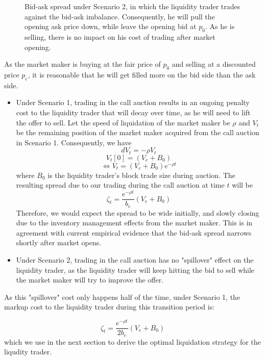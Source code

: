 \documentclass{article}
\begin{document}
\begin{itemize}
{\begin{figure}[h]
          \caption{Bid-ask spread under Scenario 2, in which the liquidity trader trades against the bid-ask imbalance. Consequently, he will pull the opening ask price down, while leave the opening bid at $p_0$. As he is selling, there is no impact on his cost of trading after market opening.}
          \label{fig:mm_pricing_transition_s2}
        \end{figure}
        }
\end{itemize}
As the market maker is buying at the fair price of $p_0$ and selling at a discounted price $p_e$, it is reasonable that he will get filled more on the bid side than the ask side.

\begin{itemize}
  \item Under Scenario 1, trading in the call auction results in an ongoing penalty cost to the liquidity trader that will decay over time, as he will need to lift the offer to sell. Let the speed of liquidation of the market maker be $\rho$ and $V_t$ be the remaining position of the market maker acquired from the call auction in Scenario 1. Consequently, we have
        \[
          dV_t = -\rho V_t
        \]
        \[
          V_t[0]=(V_e + B_0)
        \]
        \begin{equation}\label{eqn:recovery_term_eqb}
          \Leftrightarrow V_t = (V_e + B_0) e^{-\rho t}
        \end{equation}
        where $B_0$ is the liquidity trader's block trade size during auction. The resulting spread due to our trading during the call auction at time $t$ will be
        \[
          \zeta_t = \frac{e^{-\rho t}}{b_e}  (V_e + B_0)
        \]
        Therefore, we would expect the spread to be wide initially, and slowly closing due to the inventory management effects from the market maker. This is in agreement with current empirical evidence that the bid-ask spread narrows shortly after market opens.
  \item Under Scenario 2, trading in the call auction has no "spillover" effect on the liquidity trader, as the liquidity trader will keep hitting the bid to sell while the market maker will try to improve the offer.
\end{itemize}

As this "spillover" cost only happens half of the time, under Scenario 1, the markup cost to the liquidity trader during this transition period is:

\begin{equation}\label{resilence_term}
  \zeta_t = \frac{e^{-\rho t}}{2 b_e}  (V_e + B_0)
\end{equation}
which we use in the next section to derive the optimal liquidation strategy for the liqudity trader.
\end{document}
